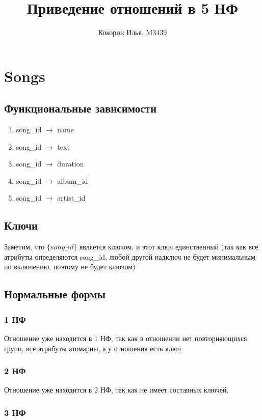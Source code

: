 \documentclass{article}
\title{Приведение отношений в 5 НФ}
\author{Кокорин Илья, M3439}
\begin{document}
	\maketitle
	

\section{Songs}

\subsection{Функциональные зависимости}
\begin{enumerate}
	\item song\_id $\rightarrow$ name
	\item song\_id $\rightarrow$ text
	\item song\_id $\rightarrow$ duration
	\item song\_id $\rightarrow$ album\_id
	\item song\_id $\rightarrow$ artist\_id
\end{enumerate}

\subsection{Ключи}
Заметим, что $\{song\_id\}$ является ключом, и этот ключ единственный (так как все атрибуты определяются song\_id, любой другой надключ не будет минимальным по включению, поэтому не будет ключом)

\subsection{Нормальные формы}

\subsubsection{1 НФ}

Отношение уже находится в 1 НФ, так как в отношении нет повторияющихся групп, все атрибуты атомарны, а у отношения есть ключ

\subsubsection{2 НФ}

Отношение уже находится в 2 НФ, так как не имеет составных ключей.

\subsubsection{3 НФ}
\end{document}
